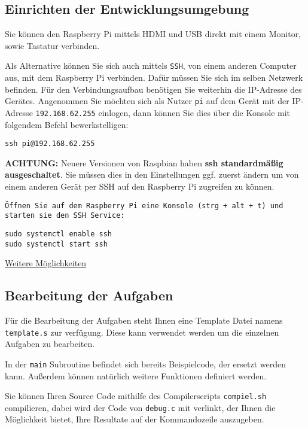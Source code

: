 \documentclass[12pt]{article}
\begin{document}
\subsection{Einrichten der Entwicklungsumgebung}
Sie können den Raspberry Pi mittels HDMI und USB direkt mit einem Monitor, sowie
Tastatur verbinden. 

Als Alternative können Sie sich auch mittels \texttt{SSH},
von einem anderen Computer aus, mit dem Raspberry Pi verbinden. Dafür müssen Sie
sich im selben Netzwerk befinden. Für den Verbindungsaufbau benötigen Sie
weiterhin die IP-Adresse des Gerätes. Angenommen Sie möchten sich als Nutzer
\texttt{pi} auf dem Gerät mit der IP-Adresse \texttt{192.168.62.255} einlogen,
dann können Sie dies über die Konsole mit folgendem Befehl bewerkstelligen:

\begin{lstlisting}
ssh pi@192.168.62.255
\end{lstlisting}

\textbf{ACHTUNG:} Neuere Versionen von Raspbian haben \textbf{ssh standardmäßig ausgeschaltet}.
Sie müssen dies in den Einstellungen ggf. zuerst ändern um von einem anderen Gerät per SSH auf den
Raspberry Pi zugreifen zu können.


\texttt{Öffnen Sie auf dem Raspberry Pi eine Konsole (strg + alt + t) und starten sie den SSH Service:}
\begin{lstlisting}
sudo systemctl enable ssh
sudo systemctl start ssh
\end{lstlisting}

\href{https://www.raspberrypi.org/documentation/remote-access/ssh/}{Weitere Möglichkeiten}


\subsection{Bearbeitung der Aufgaben}
Für die Bearbeitung der Aufgaben steht Ihnen eine Template Datei namens
\texttt{template.s} zur verfügung. Diese kann verwendet werden um die einzelnen
Aufgaben zu bearbeiten.

In der \texttt{main} Subroutine befindet sich bereits Beispielcode, der ersetzt
werden kann. Außerdem können natürlich weitere Funktionen definiert werden.

Sie können Ihren Source Code mithilfe des Compilerscripts \texttt{compiel.sh}
compilieren, dabei wird der Code von \texttt{debug.c} mit verlinkt, der Ihnen
die Möglichkeit bietet, Ihre Resultate auf der Kommandozeile auszugeben.
\end{document}

